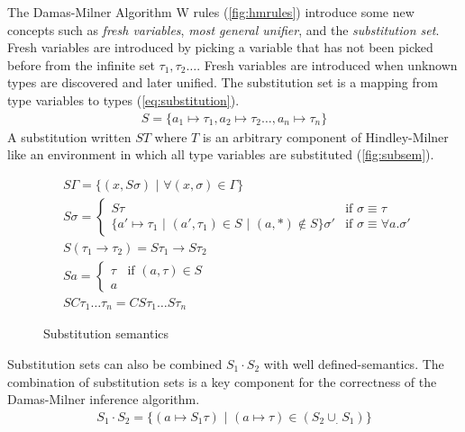 \documentclass[11pt,oneside,a4paper]{report}
\begin{document}
The Damas-Milner Algorithm W rules (\autoref{fig:hmrules}) introduce some new concepts such as \textit{fresh variables}, \textit{most general unifier}, and the \textit{substitution set}.
Fresh variables are introduced by picking a variable that has not been picked before from the infinite set $\tau_1, \tau_2 \dots $.
Fresh variables are introduced when unknown types are discovered and later unified.
The substitution set is a mapping from type variables to types (\autoref{eq:substitution}).
\begin{align}
    S = \{ a_1 \mapsto \tau_1, a_2 \mapsto \tau_2 \dots , a_n \mapsto \tau_n \} 
    \label{eq:substitution}
\end{align}
A substitution written $S T$ where $T$ is an arbitrary component of Hindley-Milner like an environment in which all type variables are substituted (\autoref{fig:subsem}).
\begin{figure}
\begin{mdframed}
\begin{align}
    &S \Gamma = \{ (x, S \sigma) \,\,|\,\, \forall (x, \sigma) \in \Gamma \} \tag{Environment}\\
    &S \sigma  = 
        \begin{cases}
            S \tau & \text{if } \sigma \equiv \tau\\
            \{ a' \mapsto \tau_1 \,\,|\,\, (a', \tau_1) \in S \,\,|\,\, (a, *) \notin S \} \sigma' & \text{if } \sigma \equiv \forall a . \sigma'
        \end{cases}
    \tag{Poly}\\
    &S (\tau_1 \rightarrow \tau_2) = S\tau_1 \rightarrow S\tau_2 \tag{Arrow}\\
    &S a = 
        \begin{cases}
            \tau & \text{if } (a, \tau) \in S\\
            a & 
        \end{cases}
    \tag{Typevariable}\\
    &S C \tau_1 \dots \tau_n = C S\tau_1 \dots S\tau_n \tag{Type constructor}
\end{align}
\end{mdframed}
    \caption{Substitution semantics}
    \label{fig:subsem}
\end{figure}
Substitution sets can also be combined $S_1 \cdot S_2$ with well defined-semantics.
The combination of substitution sets is a key component for the correctness of the Damas-Milner inference algorithm.
\begin{align}
    S_1 \cdot S_2 = \{ (a \mapsto S_1\tau) \,\,|\,\, (a \mapsto \tau) \in (S_2 \cup_. S_1) \}
    \label{eq:combination}
\end{align}
\end{document}
